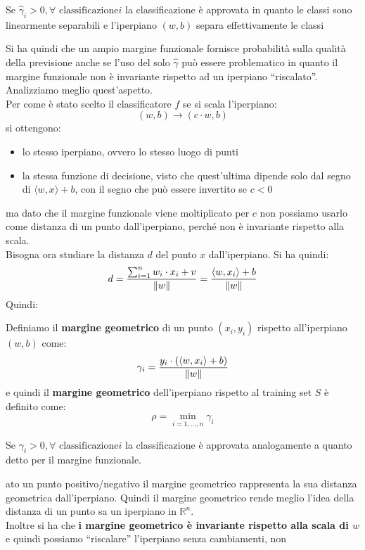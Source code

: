 \documentclass[a4paper,12pt, oneside]{book}
\begin{document}
\begin{teorema}
  Se $\hat{\gamma}_i>0,\forall \mbox{ classificazione} i$ la classificazione è
  approvata in quanto le classi sono linearmente separabili e l'iperpiano
  $(w,b)$ separa effettivamente le classi
\end{teorema}
Si ha quindi che un ampio margine funzionale fornisce probabilità sulla qualità
della previsione anche se l'uso del solo $\hat{\gamma}$ può essere problematico
in quanto il margine funzionale non è invariante rispetto ad un iperpiano
``riscalato''. Analizziamo meglio quest'aspetto.\\
Per come è stato scelto il classificatore $f$ se si scala l'iperpiano:
\[(w,b)\to(c\cdot w,b)\]
si ottengono:
\begin{itemize}
  \item lo stesso iperpiano, ovvero lo stesso luogo di punti
  \item la stessa funzione di decisione, visto che quest'ultima dipende solo dal
  segno di $\langle w,x\rangle+b$, con il segno che può essere invertito se
  $c<0$ 
\end{itemize}
ma dato che il margine funzionale viene moltiplicato per $c$ non possiamo usarlo
come distanza di un punto dall’iperpiano, perché non è invariante rispetto alla
scala.\\
Bisogna ora studiare la distanza $d$ del punto $x$ dall'iperpiano. Si ha quindi:
\[d = \frac{\sum_{i=1}^n w_i\cdot x_i+v}{\norm{w}}=\frac{\langle w,
    x_i\rangle +b}{\norm{w}} \]
Quindi:
\begin{definizione}
  Definiamo il \textbf{margine geometrico} di un punto $(x_i,y_i)$ rispetto
  all'iperpiano $(w,b)$ come:
  \[\gamma_i=\frac{y_i\cdot(\langle w,x_i\rangle+b)}{\norm{w}}\]
  e quindi il \textbf{margine geometrico} dell'iperpiano rispetto al training
  set $S$ è definito come:
  \[\rho=\min_{i=1,\ldots, n}\gamma_i\]
\end{definizione}
\begin{teorema}
  Se $\gamma_i>0,\forall \mbox{ classificazione} i$ la classificazione è
  approvata analogamente a quanto detto per il margine funzionale.
\end{teorema}
ato un punto positivo/negativo il margine geometrico rappresenta la sua
distanza geometrica dall'iperpiano. Quindi il margine geometrico rende meglio
l'idea della distanza di un punto sa un iperpiano in $\mathbb{R}^n$.\\
Inoltre si ha che \textbf{i margine geometrico è invariante rispetto alla scala
  di $w$} e quindi possiamo ``riscalare'' l'iperpiano senza cambiamenti, non
\end{document}

